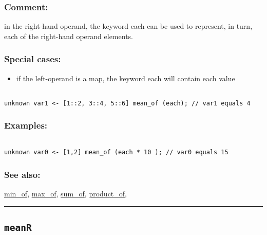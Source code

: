 \documentclass[]{book}
\providecommand{\tightlist}{%
  \setlength{\itemsep}{0pt}\setlength{\parskip}{0pt}}
\theoremstyle{definition}
\theoremstyle{definition}
\theoremstyle{definition}
\theoremstyle{remark}
\begin{document}
\subsubsection{Comment:}\label{comment-69}

in the right-hand operand, the keyword each can be used to represent, in
turn, each of the right-hand operand elements.

\subsubsection{Special cases:}\label{special-cases-96}

\begin{itemize}
\tightlist
\item
  if the left-operand is a map, the keyword each will contain each value
\end{itemize}

\begin{verbatim}
 
unknown var1 <- [1::2, 3::4, 5::6] mean_of (each); // var1 equals 4
\end{verbatim}

\subsubsection{Examples:}\label{examples-238}

\begin{verbatim}
 
unknown var0 <- [1,2] mean_of (each * 10 ); // var0 equals 15
\end{verbatim}

\subsubsection{See also:}\label{see-also-139}

\href{OperatorsIM\#min_of}{min\_of},
\href{OperatorsIM\#max_of}{max\_of},
\href{OperatorsSZ\#sum_of}{sum\_of},
\href{OperatorsNR\#product_of}{product\_of},

\begin{center}\rule{0.5\linewidth}{\linethickness}\end{center}

\subsection{\texorpdfstring{\texttt{meanR}}{meanR}}\label{meanr}
\end{document}
